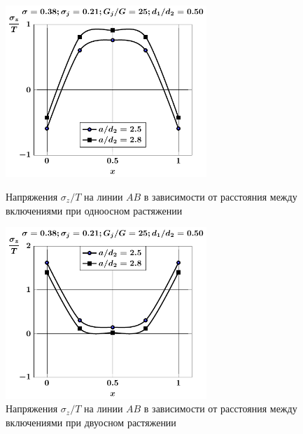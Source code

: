 \begin{russian}
\begin{figure}[h!]
\centering\footnotesize
\parbox[b]{7.5cm}{\centering\includegraphics[width=7.6cm]{oblate-inc8-a-d50-g25-t1-sig_z.pdf}
\caption{Напряжения $\sigma_z/T$ на линии $AB$ в зависимости от расстояния между включениями при одноосном растяжении
\label{f:10:18}}}\hfil\hfil
\parbox[b]{7.5cm}{\centering\includegraphics[width=7.6cm]{oblate-inc8-a-d50-g25-t2-sig_z.pdf}
\caption{Напряжения $\sigma_z/T$ на линии $AB$ в зависимости от расстояния между включениями при двуосном растяжении
\label{f:10:19}}}
\end{figure}


\end{russian}